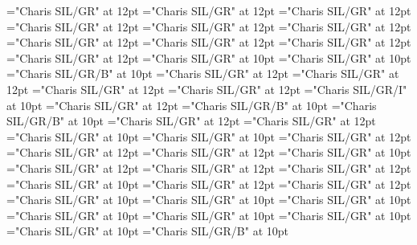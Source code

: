 \documentclass[c5paper,twoside]{article}
\begin{document}
\pagestyle{plain}
\sloppy
\setlength{\parfillskip}{0pt plus 1fil}
\font\diven="Charis SIL/GR" at 12pt
\font\spanen="Charis SIL/GR" at 12pt
\font\divggofonipaxemic="Charis SIL/GR" at 12pt
\font\spanggofonipaxemic="Charis SIL/GR" at 12pt
\font\divte="Charis SIL/GR" at 12pt
\font\spante="Charis SIL/GR" at 12pt
\font\divhi="Charis SIL/GR" at 12pt
\font\spanhi="Charis SIL/GR" at 12pt
\font\divggoTeluIN="Charis SIL/GR" at 12pt
\font\spanggoTeluIN="Charis SIL/GR" at 12pt
\font\xitemte="Charis SIL/GR" at 10pt
\font\xitemhi="Charis SIL/GR" at 10pt
\font\xitemxitemcomplexformformbefore="Charis SIL/GR/B" at 10pt
\font\xitemxitemcomplexformrefsbefore="Charis SIL/GR" at 12pt
\font\xitemxitemdefinitionbefore="Charis SIL/GR" at 12pt
\font\xitemxitementryrefcomponentbefore="Charis SIL/GR" at 12pt
\font\xitemxitementryreftypebefore="Charis SIL/GR" at 12pt
\font\xitemxitemexamplebefore="Charis SIL/GR/I" at 10pt
\font\xitemxitemexamplesbefore="Charis SIL/GR" at 12pt
\font\xitemxitemheadwordbefore="Charis SIL/GR/B" at 10pt
\font\xitemxitemLexEntrypublishStemComponentTargetMLHeadWordPubbefore="Charis SIL/GR/B" at 10pt
\font\xitemxitemLexEntryTypepublishStemComplexFormTypeReverseAbbrPubbefore="Charis SIL/GR" at 12pt
\font\xitemxitemLexEntryTypepublishStemEntryTypeAbbreviationPubbefore="Charis SIL/GR" at 12pt
\font\xitemxitemLexSensepublishStemGlossPubLdbefore="Charis SIL/GR" at 10pt
\font\xitemxitemLexSensepublishStemGlossPubLebefore="Charis SIL/GR" at 10pt
\font\xitemxitempartofspeechbefore="Charis SIL/GR" at 12pt
\font\xitemxitempictureLabelbefore="Charis SIL/GR" at 12pt
\font\xitemxitemprimaryrefsbefore="Charis SIL/GR" at 12pt
\font\xitemxitempronunciationbefore="Charis SIL/GR" at 10pt
\font\xitemxitempronunciationsbefore="Charis SIL/GR" at 12pt
\font\sensesensesensesbefore="Charis SIL/GR" at 12pt
\font\xitemxitemtranslationbefore="Charis SIL/GR" at 12pt
\font\xitemxitemtranslationLdbefore="Charis SIL/GR" at 10pt
\font\xitemtpi="Charis SIL/GR" at 12pt
\font{}="Charis SIL/GR" at 12pt
\font\entryletDatadicBody="Charis SIL/GR" at 10pt
\font\pictureRightentryletDatadicBody="Charis SIL/GR" at 10pt
\font\picturepictureRightentryletDatadicBody="Charis SIL/GR" at 10pt
\font\pictureCaptionpictureRightentryletDatadicBody="Charis SIL/GR" at 10pt
\font\CmPicturepublishStemPileThumbnailPubpictureCaptionpictureRightentryletDatadicBody="Charis SIL/GR" at 10pt
\font\pictureLabelenpictureCaptionpictureRightentryletDatadicBody="Charis SIL/GR" at 10pt
\font\spanenpictureLabelenpictureCaptionpictureRightentryletDatadicBody="Charis SIL/GR" at 10pt
\font\headwordggoTeluINentryletDatadicBody="Charis SIL/GR/B" at 10pt
\end{document}
